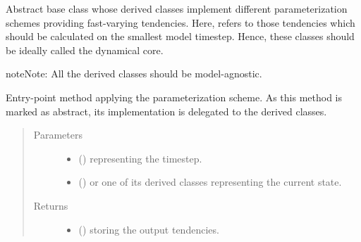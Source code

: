\documentclass[letterpaper,10pt,english]{sphinxmanual}
\begin{document}

\begin{fulllineitems}
\label{\detokenize{api:tasmania.parameterizations.fast_tendencies.FastTendency}}
Abstract base class whose derived classes implement different parameterization schemes
providing fast-varying tendencies. Here,  refers to those tendencies which
should be calculated on the smallest model timestep. Hence, these classes should be ideally
called  the dynamical core.

\begin{sphinxadmonition}{note}{Note:}
All the derived classes should be model-agnostic.
\end{sphinxadmonition}

\begin{fulllineitems}
\label{\detokenize{api:tasmania.parameterizations.fast_tendencies.FastTendency.__call__}}
Entry-point method applying the parameterization scheme.
As this method is marked as abstract, its implementation is delegated to the derived classes.
\begin{quote}\begin{description}
\item[{Parameters}] \leavevmode\begin{itemize}
\item {} 
 () \textendash{}  representing the timestep.

\item {} 
 () \textendash{} {\hyperref[\detokenize{api:tasmania.storages.grid_data.GridData}]{}} or one of its derived classes representing the current state.

\end{itemize}

\item[{Returns}] \leavevmode
\begin{itemize}
\item {} 
 () \textendash{} {\hyperref[\detokenize{api:tasmania.storages.grid_data.GridData}]{}} storing the output tendencies.


\end{itemize}
\end{description}
\end{quote}
\end{fulllineitems}
\end{fulllineitems}
\end{document}
